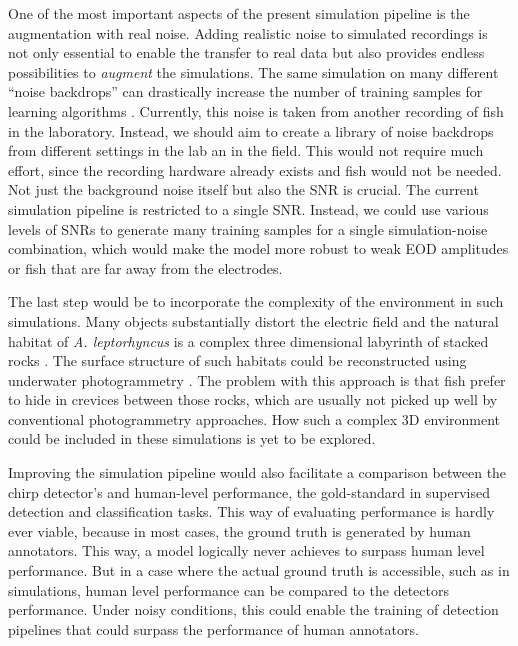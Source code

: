 One of the most important aspects of the present simulation pipeline is the
augmentation with real noise. Adding realistic noise to simulated recordings is
not only essential to enable the transfer to real data but also provides
endless possibilities to \emph{augment} the simulations. The same simulation on
many different \enquote{noise backdrops} can drastically increase the number of
training samples for learning algorithms
\parencite{salamonScaperLibrarySoundscape2017}. Currently, this noise is taken
from another recording of fish in the laboratory. Instead, we should aim to
create a library of noise backdrops from different settings in the lab an in
the field. This would not require much effort, since the recording hardware
already exists and fish would not be needed. Not just the background noise
itself but also the \acrfull{SNR} is crucial. The current simulation pipeline
is restricted to a single SNR. Instead, we could use various levels of SNRs to
generate many training samples for a single simulation-noise combination, which
would make the model more robust to weak EOD amplitudes or fish that are far
away from the electrodes.

The last step would be to incorporate the complexity of the environment in such
simulations. Many objects substantially distort the electric field
\parencite{zlenkoVisualizationElectricFields2023,
pereiraContextualEffectsSmall2005, bacherNewMethodSimulation1983} and the
natural habitat of \textit{A. leptorhyncus} is a complex three dimensional
labyrinth of stacked rocks \parencite{hagedornCourtSparkElectric1985a}. The
surface structure of such habitats could be reconstructed using underwater
photogrammetry \parencite{franciscoHighresolutionNoninvasiveAnimal2020}. The
problem with this approach is that fish prefer to hide in crevices between
those rocks, which are usually not picked up well by conventional
photogrammetry approaches. How such a complex 3D environment could be included
in these simulations is yet to be explored.

Improving the simulation pipeline would also facilitate a comparison between
the chirp detector's and human-level performance, the gold-standard in
supervised detection and classification tasks. This way of evaluating
performance is hardly ever viable, because in most cases, the ground truth is
generated by human annotators. This way, a model logically never achieves to
surpass human level performance. But in a case where the actual ground truth is
accessible, such as in simulations, human level performance can be compared to
the detectors performance. Under noisy conditions, this could enable the
training of detection pipelines that could surpass the performance of human
annotators.

